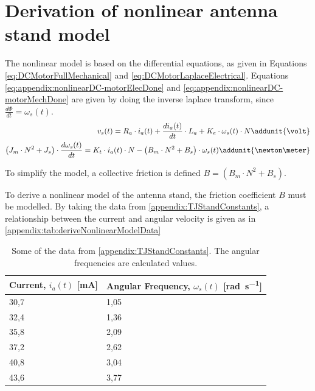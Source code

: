\chapter{Derivation of nonlinear antenna stand model}\label{appendix:nonlinearAntennaStandModel}
The nonlinear model is based on the differential equations, as given in Equations \ref{eq:DCMotorFullMechanical} and \ref{eq:DCMotorLaplaceElectrical}. Equations \ref{eq:appendix:nonlinearDC-motorElecDone} and \ref{eq:appendix:nonlinearDC-motorMechDone} are given by doing the inverse laplace transform, since $\frac{d\Phi}{dt} = \omega_s(t)$.
\begin{subequations}
	\begin{align}
	v_{s}(t) = R_{a}\cdot i_a(t) + \frac{d i_a(t)}{d t}\cdot L_a + K_{e}\cdot\omega_{s}(t)\cdot N \addunit{\volt} \label{eq:appendix:nonlinearDC-motorElecDone}\\ 
\left( J_m\cdot N^2 + J_s\right)\cdot \frac{d \omega_s(t)}{d t} = K_t\cdot i_a(t)\cdot N -\left( B_m\cdot N^2 +B_s \right)\cdot \omega_s(t) \addunit{\newton\meter} \label{eq:appendix:nonlinearDC-motorMechDone}
	\end{align}
\end{subequations}

To simplify the model, a collective friction is defined $B = \left( B_m\cdot N^2 +B_s \right)$.

To derive a nonlinear model of the antenna stand, the friction coefficient $B$ must be modelled. By taking the data from \autoref{appendix:TJStandConstants}, a relationship between the current and angular velocity is given as in \autoref{appendix:tab:deriveNonlinearModelData}
\begin{table}[!h]
	\centering
	\caption{Some of the data from \autoref{appendix:TJStandConstants}. The angular frequencies are calculated values.}\label{appendix:tab:deriveNonlinearModelData}
	\begin{tabularx}{\textwidth}{XX}
	Current, $i_a(t)$ [\si{\milli\ampere}]	& Angular Frequency, $\omega_s(t)$ [\si{\radian\per\second}]						\\ \toprule \rowcolor{lightGrey}
		 30,7 & 1,05	\\
		 32,4 & 1,36 \\ \rowcolor{lightGrey}
		 35,8 & 2,09 \\
		 37,2 & 2,62 \\ \rowcolor{lightGrey}
		 40,8 & 3,04 \\
		 43,6 & 3,77\\ 
	\end{tabularx}
\end{table}

